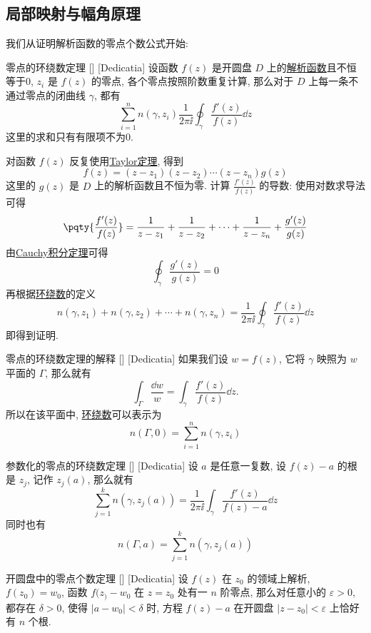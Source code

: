 \documentclass[UTF8]{ctexart}
\newcommand{\AnalyticalFunction}{\hyperref[dfn:AnalyticalFunction]{解析函数}}
\newcommand{\TaylorThm}{\hyperref[thm:Taylor]{Taylor定理}}
\newcommand{\CauchyThm}{\hyperref[thm:Cauchy]{Cauchy积分定理}}
\begin{document}
\subsection{局部映射与幅角原理}
我们从证明解析函数的零点个数公式开始: 
\begin{thm}
    [UUID]
    {零点的环绕数定理}
    []
    [Dedicatia]
    设函数 \( f(z) \) 是开圆盘 \( D \) 上的\AnalyticalFunction 且不恒等于0,  \( z_i \) 是 \( f(z) \) 的零点, 各个零点按照阶数重复计算, 那么对于 \( D \) 上每一条不通过零点的闭曲线 \( \gamma \), 都有
    \[\sum_{i=1}^n n(\gamma, z_i)\frac{1}{2\pi\ii}\oint_\gamma\frac{f'(z)}{f(z)}\dd{z} \] 
    这里的求和只有有限项不为0.
\end{thm}
\begin{prf}
    对函数 \( f(z) \) 反复使用\TaylorThm, 得到
    \[f(z)=(z-z_1)(z-z_2)\cdots(z-z_n)g(z)\]
    这里的 \( g(z) \) 是 \( D \) 上的解析函数且不恒为零. 计算 \( \frac{f'(z)}{f(z)} \) 的导数: 使用对数求导法可得
    \[\pqty{\frac{f'(z)}{f(z)}}=\frac{1}{z-z_1}+\frac{1}{z-z_2}+\cdots+\frac{1}{z-z_n}+\frac{g'(z)}{g(z)}\]
    由\CauchyThm 可得
    \[\oint_\gamma\frac{g'(z)}{g(z)}=0 \]
    再根据\hyperref[dfn:WindingNumber]{环绕数}的定义
    \[n(\gamma,z_1)+n(\gamma,z_2)+\cdots+n(\gamma,z_n)=\frac{1}{2\pi\ii}\oint_\gamma \frac{f'(z)}{f(z)}\dd{z}\]
    即得到证明. 
\end{prf}
\begin{crl}
    [UUID]
    {零点的环绕数定理的解释}
    []
    [Dedicatia]
    如果我们设 \( w=f(z) \), 它将 \( \gamma \) 映照为 \( w \) 平面的 \( \Gamma \), 那么就有
    \[\int_\Gamma\frac{\dd w}{w}=\int_\gamma \frac{f'(z)}{f(z)}\dd{z}.\]
    所以在该平面中, \hyperref[dfn:WindingNumber]{环绕数}可以表示为
    \[n(\Gamma,0)=\sum_{i=1}^n n(\gamma,z_i)\]
\end{crl}
\begin{crl}
    [UUID]
    {参数化的零点的环绕数定理}
    []
    [Dedicatia]
    设 \( a \) 是任意一复数, 设 \( f(z)-a \) 的根是 \( z_j \), 记作 \( z_j(a) \), 那么就有
    \[\sum_{j=1}^{k}n(\gamma,z_j(a))=\frac{1}{2\pi\ii}\int_\gamma\frac{f'(z)}{f(z)-a}\dd{z}\]
    同时也有
    \[n(\Gamma,a)=\sum_{j=1}^k n(\gamma,z_j(a))\]
\end{crl}
\begin{thm}
    [UUID]
    {开圆盘中的零点个数定理}
    []
    [Dedicatia]
    设 \( f(z) \) 在 \( z_0 \) 的领域上解析,  \( f(z_0)=w_0 \), 函数 \( f(z_)-w_0 \) 在 \( z=z_0 \) 处有一 \( n \) 阶零点, 那么对任意小的 \( \varepsilon>0 \), 都存在 \( \delta>0 \), 使得 \( |a-w_0|<\delta \) 时, 方程 \( f(z)-a \) 在开圆盘 \( |z-z_0|<\varepsilon \) 上恰好有 \( n \) 个根. 
\end{thm}
\end{document}
